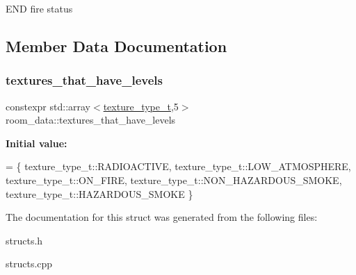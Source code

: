 E\+ND fire status 

\subsection{Member Data Documentation}
\mbox{\label{structroom__data_a153f9eb5c5c4d67bcf8ec85daedc8fa7}} 
\subsubsection{\texorpdfstring{textures\+\_\+that\+\_\+have\+\_\+levels}{textures\_that\_have\_levels}}
{\footnotesize\ttfamily constexpr std\+::array$<$\hyperlink{structroom__data_a9552b46091ee649079e41f04f9543b8e}{texture\+\_\+type\+\_\+t},5$>$ room\+\_\+data\+::textures\+\_\+that\+\_\+have\+\_\+levels\hspace{0.3cm}{\ttfamily [static]}}

{\bfseries Initial value\+:}
\begin{DoxyCode}
= \{
      texture\_type\_t::RADIOACTIVE,
      texture\_type\_t::LOW\_ATMOSPHERE,
      texture\_type\_t::ON\_FIRE,
      texture\_type\_t::NON\_HAZARDOUS\_SMOKE,
      texture\_type\_t::HAZARDOUS\_SMOKE
    \}
\end{DoxyCode}


The documentation for this struct was generated from the following files\+:\begin{DoxyCompactItemize}
\item 
structs.\+h\item 
structs.\+cpp\end{DoxyCompactItemize}
